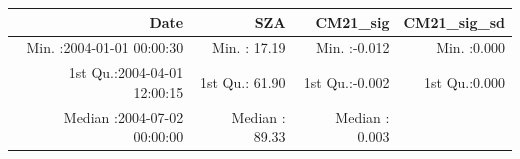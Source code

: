 \documentclass[
  10pt,
  a4paper,oneside]{article}
\begin{document}
\begin{longtable}[]{@{}rrrr@{}}
\toprule
\begin{minipage}[b]{0.33\columnwidth}\raggedleft
Date\strut
\end{minipage} & \begin{minipage}[b]{0.19\columnwidth}\raggedleft
SZA\strut
\end{minipage} & \begin{minipage}[b]{0.19\columnwidth}\raggedleft
CM21\_sig\strut
\end{minipage} & \begin{minipage}[b]{0.19\columnwidth}\raggedleft
CM21\_sig\_sd\strut
\end{minipage}\tabularnewline
\midrule
\endhead
\begin{minipage}[t]{0.33\columnwidth}\raggedleft
Min. :2004-01-01 00:00:30\strut
\end{minipage} & \begin{minipage}[t]{0.19\columnwidth}\raggedleft
Min. : 17.19\strut
\end{minipage} & \begin{minipage}[t]{0.19\columnwidth}\raggedleft
Min. :-0.012\strut
\end{minipage} & \begin{minipage}[t]{0.19\columnwidth}\raggedleft
Min. :0.000\strut
\end{minipage}\tabularnewline
\begin{minipage}[t]{0.33\columnwidth}\raggedleft
1st Qu.:2004-04-01 12:00:15\strut
\end{minipage} & \begin{minipage}[t]{0.19\columnwidth}\raggedleft
1st Qu.: 61.90\strut
\end{minipage} & \begin{minipage}[t]{0.19\columnwidth}\raggedleft
1st Qu.:-0.002\strut
\end{minipage} & \begin{minipage}[t]{0.19\columnwidth}\raggedleft
1st Qu.:0.000\strut
\end{minipage}\tabularnewline
\begin{minipage}[t]{0.33\columnwidth}\raggedleft
Median :2004-07-02 00:00:00\strut
\end{minipage} & \begin{minipage}[t]{0.19\columnwidth}\raggedleft
Median : 89.33\strut
\end{minipage} & \begin{minipage}[t]{0.19\columnwidth}\raggedleft
Median : 0.003\strut
\end{minipage} & \begin{minipage}[t]{0.19\columnwidth}\raggedleft

\end{minipage}
\end{longtable}
\end{document}

